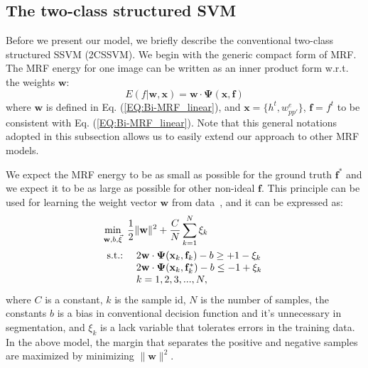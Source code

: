 \documentclass[10pt,journal,compsoc]{newIEEEtran}
\begin{document}
\subsection{The two-class structured SVM}
Before we present our model, we briefly describe the conventional two-class structured SSVM (2CSSVM). We begin with the generic compact form of MRF. The MRF energy for one image can be written as an inner product form w.r.t. the weights $\mathbf{w}$:
\begin{equation}
E(f|\mathbf{w},\mathbf{x}) %
                = \mathbf{w}\cdot \mathbf{\Psi}(\mathbf{x},\mathbf{f})
\end{equation}
where $\mathbf{w}$ is defined in Eq. (\ref{EQ:Bi-MRF_linear}), and $\mathbf{x}=\{h^t,w_{pp'}^e\}$, $\mathbf{f}=f^t$ to be consistent with Eq. (\ref{EQ:Bi-MRF_linear}). Note that this general notations adopted in this subsection allows us to easily extend our approach to other MRF models.

We expect the MRF energy to be as small as possible for the ground truth $\mathbf{f}^*$ and we expect it to be as large as possible for other non-ideal $\mathbf{f}$.
This principle can be used for learning the weight vector $\mathbf{w}$ from data~\cite{Taskar05LargeMargin,Tsochantaridis05LargeMarginSSVM}, and it can be expressed as:\vspace{-3mm}\begin{equation}\label{EQ:2C_SSVM}
\begin{split}
&\min_{\mathbf{w},b,\vec{\xi}}~ {1\over2}\|\mathbf{w}\|^2 + {C\over N}\sum_{k=1}^N \xi_k \\
& \begin{array}{rl}
                  \hbox{s.t.:}&~ 2\mathbf{w}\cdot\mathbf{\Psi}(\mathbf{x}_k,\mathbf{f}_k)-b\geq +1 - \xi_k %
                   \\
                   &~2\mathbf{w}\cdot\mathbf{\Psi}(\mathbf{x}_k,\mathbf{f}_k^*)-b\leq -1 + \xi_k\\ %
                   &~k=1,2,3,...,N,
\end{array}
\end{split}
\end{equation}
where $C$ is a constant, $k$ is the sample id, $N$ is the number of samples, the constants $b$ is a bias in conventional decision function and it's unnecessary in segmentation, and $\xi_k$ is a lack variable that tolerates errors in the training data. In the above model, the margin that separates the positive and negative samples are maximized by minimizing $\|\mathbf{w}\|^2$.%
\end{document}
